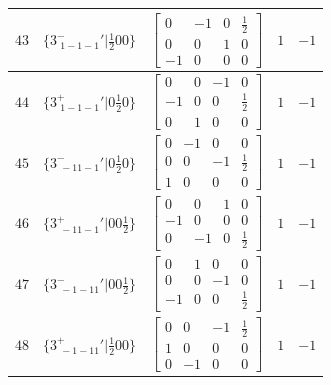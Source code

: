 \documentclass[fleqn,8pt]{jsarticle}
\begin{document}
\begin{longtable}{ccccc}
$ 43 $ & $ \{3^{-}_{\,\,1-1-1}{}'|\frac{1}{2} 0 0\} $ & $ \begin{bmatrix} 0 & -1 & 0 & \frac{1}{2} \\ 0 & 0 & 1 & 0 \\ -1 & 0 & 0 & 0 \end{bmatrix} $ & $ 1 $ & $ -1 $ \\ \hline
$ 44 $ & $ \{3^{+}_{\,\,1-1-1}{}'|0 \frac{1}{2} 0\} $ & $ \begin{bmatrix} 0 & 0 & -1 & 0 \\ -1 & 0 & 0 & \frac{1}{2} \\ 0 & 1 & 0 & 0 \end{bmatrix} $ & $ 1 $ & $ -1 $ \\ \hline
$ 45 $ & $ \{3^{-}_{\,\,-11-1}{}'|0 \frac{1}{2} 0\} $ & $ \begin{bmatrix} 0 & -1 & 0 & 0 \\ 0 & 0 & -1 & \frac{1}{2} \\ 1 & 0 & 0 & 0 \end{bmatrix} $ & $ 1 $ & $ -1 $ \\ \hline
$ 46 $ & $ \{3^{+}_{\,\,-11-1}{}'|0 0 \frac{1}{2}\} $ & $ \begin{bmatrix} 0 & 0 & 1 & 0 \\ -1 & 0 & 0 & 0 \\ 0 & -1 & 0 & \frac{1}{2} \end{bmatrix} $ & $ 1 $ & $ -1 $ \\ \hline
$ 47 $ & $ \{3^{-}_{\,\,-1-11}{}'|0 0 \frac{1}{2}\} $ & $ \begin{bmatrix} 0 & 1 & 0 & 0 \\ 0 & 0 & -1 & 0 \\ -1 & 0 & 0 & \frac{1}{2} \end{bmatrix} $ & $ 1 $ & $ -1 $ \\ \hline
$ 48 $ & $ \{3^{+}_{\,\,-1-11}{}'|\frac{1}{2} 0 0\} $ & $ \begin{bmatrix} 0 & 0 & -1 & \frac{1}{2} \\ 1 & 0 & 0 & 0 \\ 0 & -1 & 0 & 0 \end{bmatrix} $ & $ 1 $ & $ -1 $ \\
\end{longtable}
\end{document}
